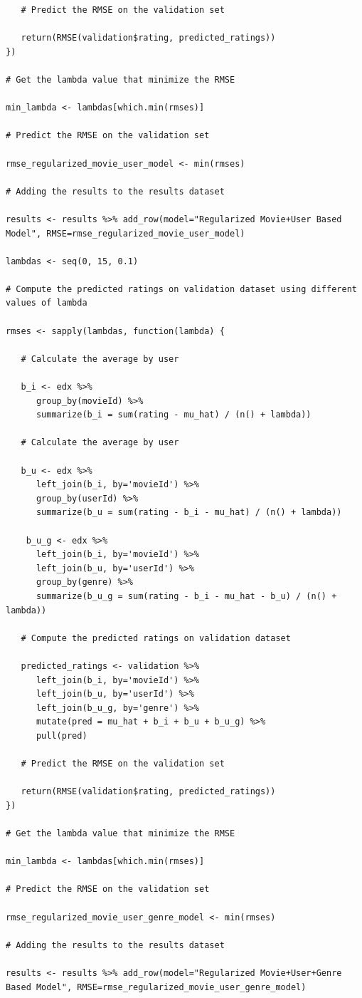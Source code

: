 \documentclass[]{article}
\begin{document}
\begin{verbatim}
   # Predict the RMSE on the validation set
   
   return(RMSE(validation$rating, predicted_ratings))
})

# Get the lambda value that minimize the RMSE

min_lambda <- lambdas[which.min(rmses)]

# Predict the RMSE on the validation set

rmse_regularized_movie_user_model <- min(rmses)

# Adding the results to the results dataset

results <- results %>% add_row(model="Regularized Movie+User Based Model", RMSE=rmse_regularized_movie_user_model)

lambdas <- seq(0, 15, 0.1)

# Compute the predicted ratings on validation dataset using different values of lambda

rmses <- sapply(lambdas, function(lambda) {

   # Calculate the average by user
   
   b_i <- edx %>%
      group_by(movieId) %>%
      summarize(b_i = sum(rating - mu_hat) / (n() + lambda))
   
   # Calculate the average by user
   
   b_u <- edx %>%
      left_join(b_i, by='movieId') %>%
      group_by(userId) %>%
      summarize(b_u = sum(rating - b_i - mu_hat) / (n() + lambda))
   
    b_u_g <- edx %>%
      left_join(b_i, by='movieId') %>%
      left_join(b_u, by='userId') %>%
      group_by(genre) %>%
      summarize(b_u_g = sum(rating - b_i - mu_hat - b_u) / (n() + lambda))
   
   # Compute the predicted ratings on validation dataset
   
   predicted_ratings <- validation %>%
      left_join(b_i, by='movieId') %>%
      left_join(b_u, by='userId') %>%
      left_join(b_u_g, by='genre') %>%
      mutate(pred = mu_hat + b_i + b_u + b_u_g) %>%
      pull(pred)
   
   # Predict the RMSE on the validation set
   
   return(RMSE(validation$rating, predicted_ratings))
})

# Get the lambda value that minimize the RMSE

min_lambda <- lambdas[which.min(rmses)]

# Predict the RMSE on the validation set

rmse_regularized_movie_user_genre_model <- min(rmses)

# Adding the results to the results dataset

results <- results %>% add_row(model="Regularized Movie+User+Genre Based Model", RMSE=rmse_regularized_movie_user_genre_model)
\end{verbatim}
\end{document}
